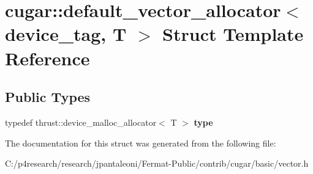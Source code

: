 \hypertarget{structcugar_1_1default__vector__allocator_3_01device__tag_00_01_t_01_4}{}\section{cugar\+:\+:default\+\_\+vector\+\_\+allocator$<$ device\+\_\+tag, T $>$ Struct Template Reference}
\label{structcugar_1_1default__vector__allocator_3_01device__tag_00_01_t_01_4}
\subsection*{Public Types}
\begin{DoxyCompactItemize}
\item 
typedef thrust\+::device\+\_\+malloc\+\_\+allocator$<$ T $>$ {\bfseries type}
\end{DoxyCompactItemize}


The documentation for this struct was generated from the following file\+:\begin{DoxyCompactItemize}
\item 
C\+:/p4research/research/jpantaleoni/\+Fermat-\/\+Public/contrib/cugar/basic/vector.\+h\end{DoxyCompactItemize}
